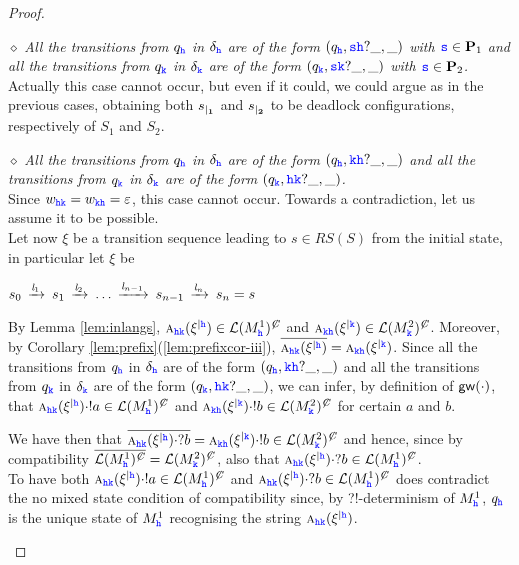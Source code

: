 \begin{proof}
\begin{description}
\item
\underline{$\diamond$} 
{\em  All the transitions from $q_\HH$ in $\delta_\HH$ are of the form $(q_\HH,\tts\HH?\_,\_)$ with $\tts\in\roles_1$ and
all the transitions from $q_\KK$ in $\delta_\KK$ are of the form $(q_\KK,\tts\KK?\_,\_)$ with $\tts\in\roles_2$.}\\
Actually this case cannot occur, but even if it could, we could argue as in the previous cases, obtaining
both $\restrict{s}{1}$ and $\restrict{s}{2}$ to be deadlock configurations, respectively of $S_1$ and $S_2$.

\item
\underline{$\diamond$}
{\em  All the transitions from $q_\HH$ in $\delta_\HH$ are of the form $(q_\HH,\KK\HH?\_,\_)$ and
all the transitions from $q_\KK$ in $\delta_\KK$ are of the form $(q_\KK,\HH\KK?\_,\_)$.}\\
 Since $w_{\HH\KK}=w_{\KK\HH}=\varepsilon$,
this case cannot occur. Towards a contradiction, let us assume it to be possible.\\
Let now $\xi$ be a transition sequence leading to $s\in RS(S)$ from the initial state, in particular let $\xi$ be\\
\centerline{
$s_0\lts{\elle_1}s_1\lts{\elle_2} \ldots \lts{\elle_{n-1}}s_{n-1}\lts{\elle_n}s_n=s$
}
 By Lemma \ref{lem:inlangs},
 $\symb{\HH\KK}{\restrictup{\xi}{\HH}}\in\lang{M^1_\HH}^\mC $ and $\symb{\KK\HH}{\restrictup{\xi}{\KK}}\in\lang{M^2_\KK}^\mC$. Moreover, by Corollary \ref{lem:prefix}(\ref{lem:prefixcor-iii}),
  $\Dual{\symb{\HH\KK}{\restrictup{\xi}{\HH}}}=\symb{\KK\HH}{\restrictup{\xi}{\KK}}$.
  Since all the transitions from $q_\HH$ in $\delta_\HH$ are of the form $(q_\HH,\KK\HH?\_,\_)$ and
all the transitions from $q_\KK$ in $\delta_\KK$ are of the form $(q_\KK,\HH\KK?\_,\_)$,
we can infer, by definition of $\gateway{\cdot}$, that  $\symb{\HH\KK}{\restrictup{\xi}{\HH}}\cdot !a\in\lang{M^1_\HH}^\mC $ and $\symb{\KK\HH}{\restrictup{\xi}{\KK}}\cdot !b\in\lang{M^2_\KK}^\mC$ for certain $a$ and $b$.

We have then that $\Dual{\symb{\HH\KK}{\restrictup{\xi}{\HH}}\cdot ?b} = {\symb{\KK\HH}{\restrictup{\xi}{\KK}}\cdot !b} \in\lang{M^2_\KK}^\mC$
and hence, since by compatibility $\Dual{\lang{M^1_\HH}^\mC} = \lang{M^2_\KK}^\mC$, also that
 $\symb{\HH\KK}{\restrictup{\xi}{\HH}}\cdot ?b\in \lang{M^1_\HH}^\mC$.\\
 To have both $\symb{\HH\KK}{\restrictup{\xi}{\HH}}\cdot !a\in\lang{M^1_\HH}^\mC $ and 
 $\symb{\HH\KK}{\restrictup{\xi}{\HH}}\cdot ?b\in \lang{M^1_\HH}^\mC$
does contradict the no mixed state condition of compatibility since,
 by ?!-determinism of $M^1_\HH$, ${q}_\HH$ is the unique state of $M^1_\HH$ 
recognising the string $\symb{\HH\KK}{\restrictup{\xi}{\HH}}$. 
\end{description}
\end{proof}

